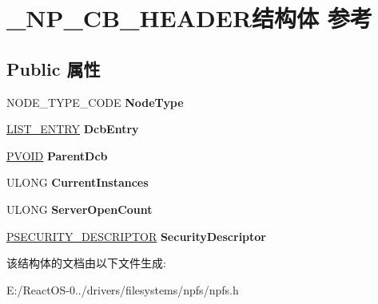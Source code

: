 \hypertarget{struct___n_p___c_b___h_e_a_d_e_r}{}\section{\+\_\+\+N\+P\+\_\+\+C\+B\+\_\+\+H\+E\+A\+D\+E\+R结构体 参考}
\label{struct___n_p___c_b___h_e_a_d_e_r}
\subsection*{Public 属性}
\begin{DoxyCompactItemize}
\item 
\mbox{\label{struct___n_p___c_b___h_e_a_d_e_r_a4785c9a30d22636949e4d7e249ef7fed}} 
N\+O\+D\+E\+\_\+\+T\+Y\+P\+E\+\_\+\+C\+O\+DE {\bfseries Node\+Type}
\item 
\mbox{\label{struct___n_p___c_b___h_e_a_d_e_r_a93a30fa279eb646308c5f0fdc0a0a3ee}} 
\hyperlink{struct___l_i_s_t___e_n_t_r_y}{L\+I\+S\+T\+\_\+\+E\+N\+T\+RY} {\bfseries Dcb\+Entry}
\item 
\mbox{\label{struct___n_p___c_b___h_e_a_d_e_r_a62d801127e6d56a365b9d5601891846a}} 
\hyperlink{interfacevoid}{P\+V\+O\+ID} {\bfseries Parent\+Dcb}
\item 
\mbox{\label{struct___n_p___c_b___h_e_a_d_e_r_a8161f7f9a3ee3ad53fa922e8ad997a40}} 
U\+L\+O\+NG {\bfseries Current\+Instances}
\item 
\mbox{\label{struct___n_p___c_b___h_e_a_d_e_r_adead67d1d84a1e62938131b129c4e876}} 
U\+L\+O\+NG {\bfseries Server\+Open\+Count}
\item 
\mbox{\label{struct___n_p___c_b___h_e_a_d_e_r_a68f2ec0d28bb98aed30aa53686a19a30}} 
\hyperlink{struct___s_e_c_u_r_i_t_y___d_e_s_c_r_i_p_t_o_r}{P\+S\+E\+C\+U\+R\+I\+T\+Y\+\_\+\+D\+E\+S\+C\+R\+I\+P\+T\+OR} {\bfseries Security\+Descriptor}
\end{DoxyCompactItemize}


该结构体的文档由以下文件生成\+:\begin{DoxyCompactItemize}
\item 
E\+:/\+React\+O\+S-\/0../drivers/filesystems/npfs/npfs.\+h\end{DoxyCompactItemize}
